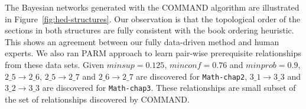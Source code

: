 \documentclass{edm_template}
\newcommand{\hl}[1]{\colorbox{yellow}{#1}}
\begin{document}
	The Bayesian networks generated with the COMMAND algorithm are illustrated in Figure~\ref{fig:hed-structures}.
	Our observation is that the topological order of the sections in both structures are fully consistent with the book ordering heuristic.
	This shows an agreement between our fully data-driven method and human experts.
	We also ran PARM approach to learn pair-wise prerequisite relationships from these data sets. Given $minsup=0.125$, $minconf=0.76$ and $minprob=0.9$,
	$2\_5\rightarrow 2\_6$, $2\_5\rightarrow 2\_7$ and $2\_6\rightarrow 2\_7$ are discovered for \texttt{Math-chap2},
	$3\_1\rightarrow 3\_3$ and $3\_2\rightarrow 3\_3$ are discovered for \texttt{Math-chap3}.
	These relationships are small subset of the set of relationships discovered by COMMAND. 

	
\end{document}
